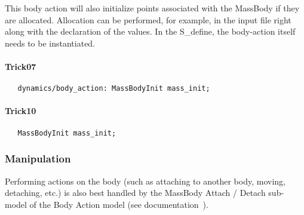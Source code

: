This body action will also initialize points associated with the MassBody if 
they are allocated.  Allocation can be performed, for example, in the input 
file right along with the declaration of the values.  In the S\_define, the 
body-action itself needs to be instantiated.
\paragraph{Trick07}
\begin{verbatim}
   dynamics/body_action: MassBodyInit mass_init;
\end{verbatim}
\paragraph{Trick10}
\begin{verbatim}
   MassBodyInit mass_init;
\end{verbatim}

\subsubsection{Manipulation}
Performing actions on the body (such as attaching to another body, moving, 
detaching, etc.) is also best handled by the MassBody Attach / Detach 
sub-model of the Body Action model (see 
documentation~\cite{dynenv:BODYACTION}).

